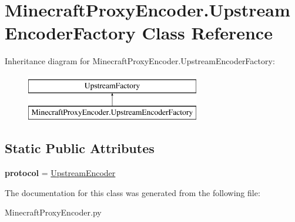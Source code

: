 \hypertarget{classMinecraftProxyEncoder_1_1UpstreamEncoderFactory}{\section{Minecraft\-Proxy\-Encoder.\-Upstream\-Encoder\-Factory Class Reference}
\label{classMinecraftProxyEncoder_1_1UpstreamEncoderFactory}
}
Inheritance diagram for Minecraft\-Proxy\-Encoder.\-Upstream\-Encoder\-Factory\-:\begin{figure}[H]
\begin{center}
\leavevmode
\includegraphics[height=2.000000cm]{classMinecraftProxyEncoder_1_1UpstreamEncoderFactory}
\end{center}
\end{figure}
\subsection*{Static Public Attributes}
\begin{DoxyCompactItemize}
\item 
\hypertarget{classMinecraftProxyEncoder_1_1UpstreamEncoderFactory_a0998ef42b6ade35b895175e7dc6100dd}{{\bfseries protocol} = \hyperlink{classMinecraftProxyEncoder_1_1UpstreamEncoder}{Upstream\-Encoder}}\label{classMinecraftProxyEncoder_1_1UpstreamEncoderFactory_a0998ef42b6ade35b895175e7dc6100dd}

\end{DoxyCompactItemize}


The documentation for this class was generated from the following file\-:\begin{DoxyCompactItemize}
\item 
Minecraft\-Proxy\-Encoder.\-py\end{DoxyCompactItemize}
